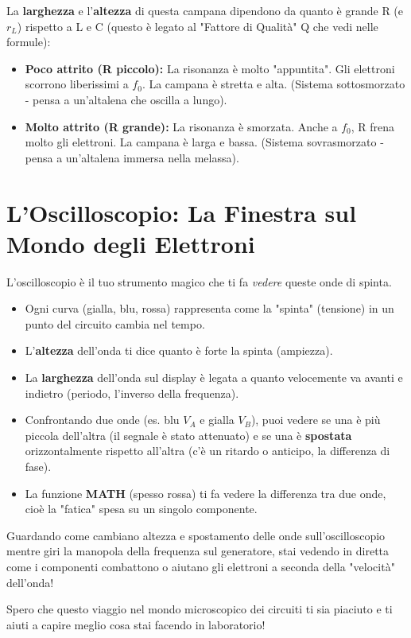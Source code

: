 \documentclass[a4paper, 11pt]{article}
\begin{document}
La \textbf{larghezza} e l'\textbf{altezza} di questa campana dipendono da quanto è grande R (e $r_L$) rispetto a L e C (questo è legato al "Fattore di Qualità" Q che vedi nelle formule):
\begin{itemize}
    \item \textbf{Poco attrito (R piccolo):} La risonanza è molto "appuntita". Gli elettroni scorrono liberissimi a $f_0$. La campana è stretta e alta. (Sistema sottosmorzato - pensa a un'altalena che oscilla a lungo).
    \item \textbf{Molto attrito (R grande):} La risonanza è smorzata. Anche a $f_0$, R frena molto gli elettroni. La campana è larga e bassa. (Sistema sovrasmorzato - pensa a un'altalena immersa nella melassa).
\end{itemize}

\section*{L'Oscilloscopio: La Finestra sul Mondo degli Elettroni}

L'oscilloscopio è il tuo strumento magico che ti fa \textit{vedere} queste onde di spinta.
\begin{itemize}
    \item Ogni curva (gialla, blu, rossa) rappresenta come la "spinta" (tensione) in un punto del circuito cambia nel tempo.
    \item L'\textbf{altezza} dell'onda ti dice quanto è forte la spinta (ampiezza).
    \item La \textbf{larghezza} dell'onda sul display è legata a quanto velocemente va avanti e indietro (periodo, l'inverso della frequenza).
    \item Confrontando due onde (es. blu $V_A$ e gialla $V_B$), puoi vedere se una è più piccola dell'altra (il segnale è stato attenuato) e se una è \textbf{spostata} orizzontalmente rispetto all'altra (c'è un ritardo o anticipo, la differenza di fase).
    \item La funzione \textbf{MATH} (spesso rossa) ti fa vedere la differenza tra due onde, cioè la "fatica" spesa su un singolo componente.
\end{itemize}
Guardando come cambiano altezza e spostamento delle onde sull'oscilloscopio mentre giri la manopola della frequenza sul generatore, stai vedendo in diretta come i componenti combattono o aiutano gli elettroni a seconda della "velocità" dell'onda!

Spero che questo viaggio nel mondo microscopico dei circuiti ti sia piaciuto e ti aiuti a capire meglio cosa stai facendo in laboratorio!
\end{document}
